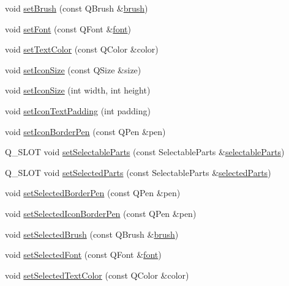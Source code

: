 \begin{DoxyCompactItemize}
void \hyperlink{class_q_c_p_legend_a497bbcd38baa3598c08e2b3f48103f23}{set\+Brush} (const Q\+Brush \&\hyperlink{class_q_c_p_legend_a7e5d2766e7d724f399022be8a4e8a2cb}{brush})
\item 
void \hyperlink{class_q_c_p_legend_aa4cda8499e3cb0f3be415edc02984c73}{set\+Font} (const Q\+Font \&\hyperlink{class_q_c_p_legend_a5cf8b840bc02f7bf4edb8dde400d0f41}{font})
\item 
void \hyperlink{class_q_c_p_legend_ae1eb239ff4a4632fe1b6c3e668d845c6}{set\+Text\+Color} (const Q\+Color \&color)
\item 
void \hyperlink{class_q_c_p_legend_a8b0740cce488bf7010da6beda6898984}{set\+Icon\+Size} (const Q\+Size \&size)
\item 
void \hyperlink{class_q_c_p_legend_a96b1a37fd4ee6a9778e6e54fe56ab6c2}{set\+Icon\+Size} (int width, int height)
\item 
void \hyperlink{class_q_c_p_legend_a62973bd69d5155e8ea3141366e8968f6}{set\+Icon\+Text\+Padding} (int padding)
\item 
void \hyperlink{class_q_c_p_legend_a2f2c93d18a651f4ff294bb3f026f49b8}{set\+Icon\+Border\+Pen} (const Q\+Pen \&pen)
\item 
Q\+\_\+\+S\+L\+O\+T void \hyperlink{class_q_c_p_legend_a9ce60aa8bbd89f62ae4fa83ac6c60110}{set\+Selectable\+Parts} (const Selectable\+Parts \&\hyperlink{class_q_c_p_legend_aa90c7fdbad7a0e93527bafb1f1f49a43}{selectable\+Parts})
\item 
Q\+\_\+\+S\+L\+O\+T void \hyperlink{class_q_c_p_legend_a2aee309bb5c2a794b1987f3fc97f8ad8}{set\+Selected\+Parts} (const Selectable\+Parts \&\hyperlink{class_q_c_p_legend_abbbf1b2d6a149013527ed87b0780894a}{selected\+Parts})
\item 
void \hyperlink{class_q_c_p_legend_a2c35d262953a25d96b6112653fbefc88}{set\+Selected\+Border\+Pen} (const Q\+Pen \&pen)
\item 
void \hyperlink{class_q_c_p_legend_ade93aabe9bcccaf9cf46cec22c658027}{set\+Selected\+Icon\+Border\+Pen} (const Q\+Pen \&pen)
\item 
void \hyperlink{class_q_c_p_legend_a875227f3219c9799464631dec5e8f1bd}{set\+Selected\+Brush} (const Q\+Brush \&\hyperlink{class_q_c_p_legend_a7e5d2766e7d724f399022be8a4e8a2cb}{brush})
\item 
void \hyperlink{class_q_c_p_legend_ab580a01c3c0a239374ed66c29edf5ad2}{set\+Selected\+Font} (const Q\+Font \&\hyperlink{class_q_c_p_legend_a5cf8b840bc02f7bf4edb8dde400d0f41}{font})
\item 
void \hyperlink{class_q_c_p_legend_a7674dfc7a1f30e1abd1018c0ed45e0bc}{set\+Selected\+Text\+Color} (const Q\+Color \&color)

\end{DoxyCompactItemize}
